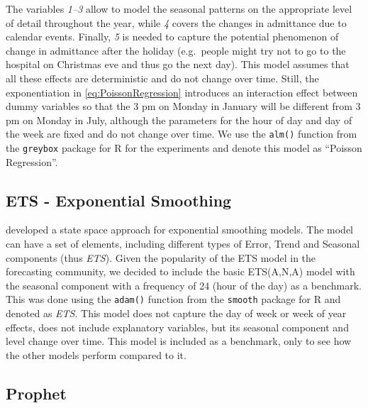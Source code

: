 \documentclass[]{elsarticle} %
\begin{document}
The variables \emph{1--3} allow to model the seasonal patterns on the
appropriate level of detail throughout the year, while \emph{4} covers the
changes in admittance due to calendar events. Finally, \emph{5} is needed to
capture the potential phenomenon of change in admittance after the
holiday (e.g.~people might try not to go to the hospital on Christmas
eve and thus go the next day). This model assumes that all these effects
are deterministic and do not change over time. Still, the exponentiation
in \eqref{eq:PoissonRegression} introduces an interaction effect between
dummy variables so that the 3 pm on Monday in January will be different
from 3 pm on Monday in July, although the parameters for the hour of day
and day of the week are fixed and do not change over time. We use the
\texttt{alm()} function from the \texttt{greybox} package \citep{Svetunkov2021Greybox} for
R \citep{RTeam2021} for the experiments and denote this model as ``Poisson
Regression''.

\hypertarget{ets---exponential-smoothing}{%
\subsection{ETS - Exponential Smoothing}\label{ets---exponential-smoothing}}

\citet{Hyndman2008b} developed a state space approach for exponential smoothing
models. The model can have a set of elements, including different types
of Error, Trend and Seasonal components (thus \emph{ETS}). Given the
popularity of the ETS model in the forecasting community, we decided to
include the basic ETS(A,N,A) model with the seasonal component with a
frequency of 24 (hour of the day) as a benchmark. This was done using
the \texttt{adam()} function from the \texttt{smooth} package \citep{Svetunkov2021Smooth}
for R and denoted as \emph{ETS}. This model does not capture the day of week
or week of year effects, does not include explanatory variables, but its
seasonal component and level change over time. This model is included as
a benchmark, only to see how the other models perform compared to it.

\hypertarget{prophet}{%
\subsection{Prophet}\label{prophet}}
\end{document}
